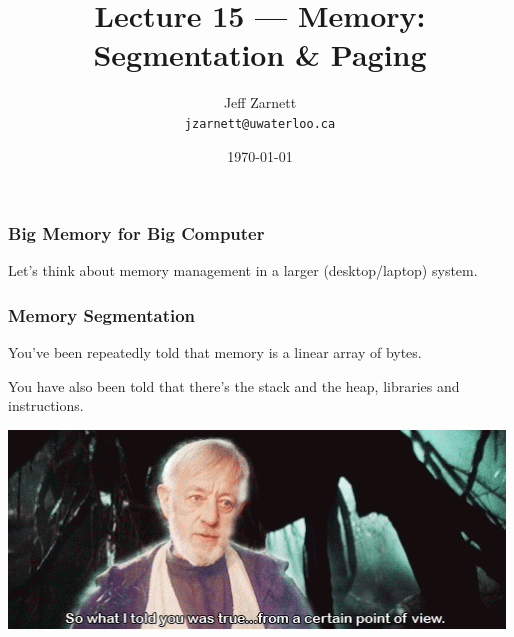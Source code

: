 

\title{Lecture 15 --- Memory: Segmentation \& Paging }

\author{Jeff Zarnett \\ \small \texttt{jzarnett@uwaterloo.ca}}
\date{\today}




\begin{frame}
  \titlepage

 \end{frame}

\begin{frame}
\frametitle{Big Memory for Big Computer}

Let's think about memory management in a larger (desktop/laptop) system.


\end{frame}


\begin{frame}
\frametitle{Memory Segmentation}

You've been repeatedly told that memory is a linear array of bytes. 

You have also been told that there's the stack and the heap, libraries and instructions.

\begin{center}
	\includegraphics[width=\textwidth]{images/pov.jpg}
\end{center}

 \end{frame}



